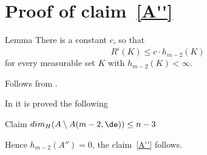 \section{Proof of claim~\ref{A''}}\label{sec:codim3}

\begin{thm} {Lemma}
There is a constant $c$, so that
$$R^i(K)\le c\cdot h_{m-2}(K)$$ for every
measurable set $K$ with $h_{m-2}(K)<\infty$.
\end{thm}

Follows from \cite[???]{petrunin-SC}.
\qeds

In \cite{BGP} it is proved the following
\begin{thm}{Claim}
$dim_H(A\setminus A(m-2,\de) )\le n-3$
\end{thm}
Hence $h_{m-2}(A'')=0$, the claim~\ref{A''} follows.
